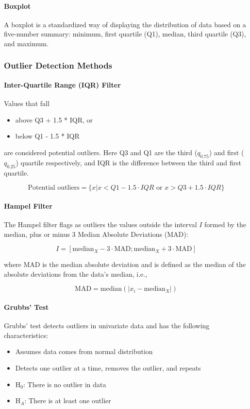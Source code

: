 \paragraph{Boxplot} A boxplot is a standardized way of displaying the distribution of data based on a five-number summary: minimum, first quartile (Q1), median, third quartile (Q3), and maximum.

\subsubsection{Outlier Detection Methods}

\paragraph{Inter-Quartile Range (IQR) Filter} Values that fall
\begin{itemize}
    \item above Q3 + 1.5 * IQR, or
    \item below Q1 - 1.5 * IQR
\end{itemize}
are considered potential outliers. Here Q3 and Q1 are the third ($q_{0.75}$) and first ($q_{0.25}$) quartile respectively, and IQR is the difference between the third and first quartile.

\begin{equation}
\text{Potential outliers} = \{x | x < Q1 - 1.5 \cdot IQR \text{ or } x > Q3 + 1.5 \cdot IQR\}
\end{equation}

\paragraph{Hampel Filter} The Hampel filter flags as outliers the values outside the interval $I$ formed by the median, plus or minus 3 Median Absolute Deviations (MAD):

\begin{equation}
I = [\text{median}_X - 3 \cdot \text{MAD}; \text{median}_X + 3 \cdot \text{MAD}]
\end{equation}

where MAD is the median absolute deviation and is defined as the median of the absolute deviations from the data's median, i.e.,

\begin{equation}
\text{MAD} = \text{median}(|x_i - \text{median}_X|)
\end{equation}

\paragraph{Grubbs' Test} Grubbs' test detects outliers in univariate data and has the following characteristics:
\begin{itemize}
    \item Assumes data comes from normal distribution
    \item Detects one outlier at a time, removes the outlier, and repeats
    \item H$_0$: There is no outlier in data
    \item H$_A$: There is at least one outlier
\end{itemize}

